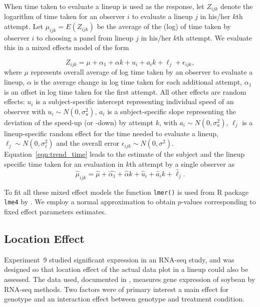 \documentclass[10pt]{article}\usepackage[]{graphicx}\usepackage[]{xcolor}
\begin{document}
When time taken to evaluate a lineup is used as the response, let $Z_{ijk}$ denote the logarithm of time taken for an observer $i$ to evaluate a  lineup $j$ in his/her $k$th attempt. Let $\mu_{ijk}=  E(Z_{ijk})$ be the average of the (log) of time taken by  observer $i$ to choosing a  panel from lineup $j$ in his/her $k$th attempt. We evaluate this in a mixed effects model of the form

\begin{equation} \label{eqn:trend_time}
Z_{ijk} = \mu + \alpha_1 + \alpha k + u_i +  a_{i} k + \ell_j + \epsilon_{ijk},  
\end{equation}
where $\mu$ represents overall average of log time taken by an observer to evaluate a lineup, $\alpha$ is the average change in log time taken for each additional attempt,  $\alpha_1$ is an offset in log time taken for the first attempt. All other effects are random effects: $u_i$ is a subject-specific intercept representing individual speed of an observer with $u_i \sim N(0, \sigma_u^2)$, $a_i$ is a subject-specific slope representing the deviation of the speed-up (or -down) by attempt $k$, with $a_i \sim N(0, \sigma_a^2)$, $\ell_j$ is a lineup-specific random effect for the time needed to evaluate a lineup, $\ell_j \sim N(0, \sigma_\ell^2)$ and the overall error $\epsilon_{ijk} \sim N(0, \sigma^2)$.
Equation~\ref{eqn:trend_time} leads to the estimate of the subject and the lineup specific time taken for an evaluation in $k$th attempt by a single observer as 
\begin{equation} \label{eqn:trend_time_est}
\hat \mu_{ijk} =  \hat{\mu} + \hat{\alpha_1}+ \hat{\alpha}k + \hat{u}_i +  \hat{a}_i k + \hat{\ell}_j.
\end{equation}

To fit all these mixed effect models the function {\tt lmer()} is used from R package {\tt lme4} by \cite{lme4:2015, lme4:paper}. We employ a normal approximation to obtain $p$-values corresponding to fixed effect parameters estimates.  

\subsection{Location Effect} \label{sec:location_design} Experiment~9 studied significant expression in an RNA-seq study, and was designed so that location effect of the actual data plot in a lineup could also be assessed. The data used, documented in \cite{atwood:2013}, measures gene expression of soybean by RNA-seq methods. Two factors were of primary interest a main effect for genotype and an interaction effect between genotype and treatment condition.
\end{document}

